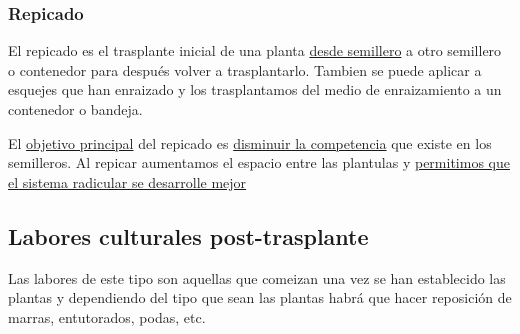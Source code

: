 \documentclass[a4paper,12pt,oneside]{article}
\begin{document}
\subsubsection{Repicado}
\label{sec:org5b43ab5}
El repicado es el trasplante inicial de una planta \uline{desde semillero} a otro
semillero o contenedor para después volver a trasplantarlo. Tambien se puede
aplicar a esquejes que han enraizado y los trasplantamos del medio de
enraizamiento a un contenedor o bandeja.

El \uline{objetivo principal} del repicado es \uline{disminuir la competencia} que existe en
los semilleros. Al repicar aumentamos el espacio entre las plantulas y
\uline{permitimos que el sistema radicular se desarrolle mejor}

\subsection{Labores culturales post-trasplante}
\label{sec:orgebb8066}
Las labores de este tipo son aquellas que comeizan una vez se han establecido
las plantas y dependiendo del tipo que sean las plantas habrá que hacer
reposición de marras, entutorados, podas, etc. 
\end{document}
